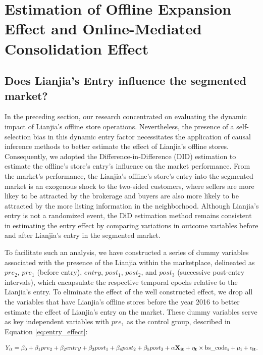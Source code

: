 \documentclass[11pt]{article}
\begin{document}
\section{Estimation of Offline Expansion Effect and Online-Mediated Consolidation Effect} \label{sec:mechanism_design}

\subsection{Does Lianjia's Entry influence the segmented market?} \label{subsec:entry_effect}

In the preceding section, our research concentrated on evaluating the dynamic impact of Lianjia's offline store operations. Nevertheless, the presence of a self-selection bias in this dynamic entry factor necessitates the application of causal inference methods to better estimate the effect of Lianjia's offline stores. Consequently, we adopted the Difference-in-Difference (DID) estimation to estimate the offline's store's entry's influence on the market performance. From the market's performance, the Lianjia's offline's store's entry into the segmented market is an exogenous shock to the two-sided customers, where sellers are more likey to be attracted by the brokerage and buyers are also more likely to be attracted by the more listing information in the neighborhood. Although Lianjia's entry is not a randomized event, the DiD estimation method remains consistent in estimating the entry effect by comparing variations in outcome variables before and after Lianjia's entry in the segmented market.

To facilitate such an analysis, we have constructed a series of dummy variables associated with the presence of the Lianjia within the marketplace, delineated as $pre_2$, $pre_1$ (before entry), $entry$, $post_1$, $post_2$, and $post_3$ (successive post-entry intervals), which encapsulate the respective temporal epochs relative to the Lianjia's entry. To eliminate the effect of the well constructed effect, we drop all the variables that have Lianjia's offline stores before the year 2016 to better estimate the effect of Lianjia's entry on the market. These dummy variables serve as key independent variables with $pre_1$ as the control group, described in Equation \eqref{eq:entry_effect}:

\begin{equation}
  Y_{it} = \beta_0 +  \beta_1 pre_2 + \beta_2 entry + \beta_3 post_1 + \beta_4 post_2 + \beta_5 post_3 + \bf{\alpha} \bf{X}_{it} + \eta_{t} \times \text{bs\_code}_i + \mu_i + \epsilon_{it}.   \label{eq:entry_effect}
\end{equation}
\end{document}
